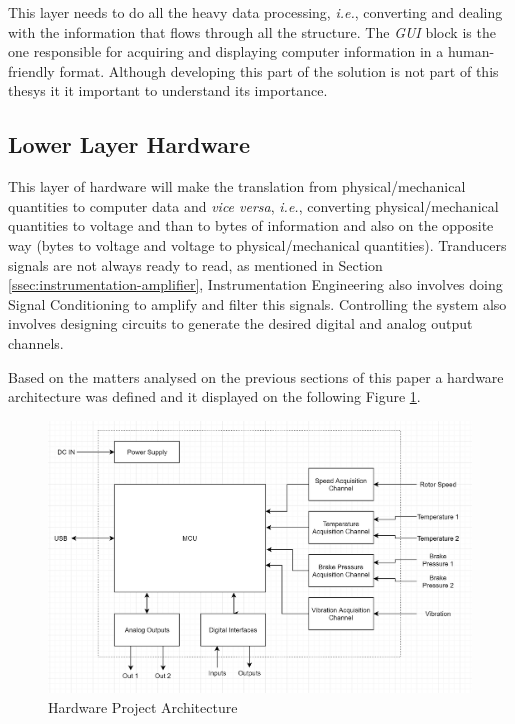 		This layer needs to do all the heavy data processing, \textit{i.e.}, converting and dealing with the information that flows through all the structure. The \textit{GUI} block is the one responsible for acquiring and displaying computer information in a human-friendly format. Although developing this part of the solution is not part of this thesys it it important to understand its importance.

	\subsection{Lower Layer Hardware}\label{ssec:lowerLayerlHardware}

		This layer of hardware will make the translation from physical/mechanical quantities to computer data and \textit{vice versa}, \textit{i.e.}, converting physical/mechanical quantities to voltage and than to bytes of information and also on the opposite way (bytes to voltage and voltage to physical/mechanical quantities). Tranducers signals are not always ready to read, as mentioned in Section \ref{ssec:instrumentation-amplifier}, Instrumentation Engineering also involves doing Signal Conditioning to amplify and filter this signals. Controlling the system also involves designing circuits to generate the desired digital and analog output channels.
		\par
		Based on the matters analysed on the previous sections of this paper a hardware architecture was defined and it displayed on the following Figure \ref{fig:hardwareProject}.
	
		\begin{figure}[htbp]
			\centering
			\includegraphics[width=.8\textwidth]{figuras/fig-hardwareProject}
			\caption{Hardware Project Architecture \cite{hw-proj}}
			\label{fig:hardwareProject}
		\end{figure}

